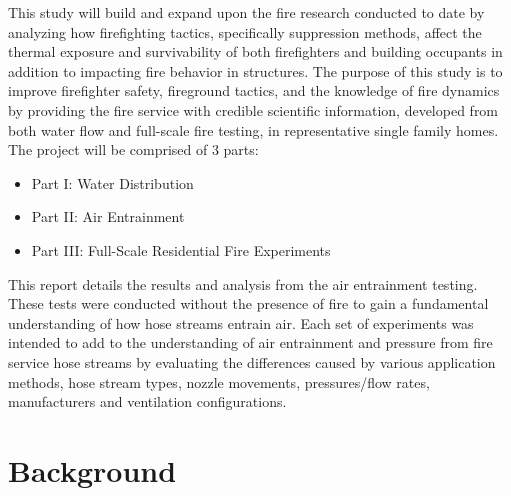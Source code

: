 \documentclass[12pt,oneside]{book}
\begin{document}
\vspace*{\baselineskip}

This study will build and expand upon the fire research conducted to date by analyzing how firefighting tactics, specifically suppression methods, affect the thermal exposure and survivability of both firefighters and building occupants in addition to impacting fire behavior in structures. The purpose of this study is to improve firefighter safety, fireground tactics, and the knowledge of fire dynamics by providing the fire service with credible scientific information, developed from both water flow and full-scale fire testing, in representative single family homes. The project will be comprised of 3 parts:
\vspace*{\baselineskip}
\begin{itemize}
	\item Part I:  Water Distribution
	\item Part II: Air Entrainment
	\item Part III: Full-Scale Residential Fire Experiments
	\end{itemize}
\vspace*{\baselineskip}

This report details the results and analysis from the air entrainment testing. These tests were conducted without the presence of fire to gain a fundamental understanding of how hose streams entrain air. Each set of experiments was intended to add to the understanding of air entrainment and pressure from fire service hose streams by evaluating the differences caused by various application methods, hose stream types, nozzle movements, pressures/flow rates, manufacturers and ventilation configurations.




\newpage

\chapter{Background}
\end{document}
